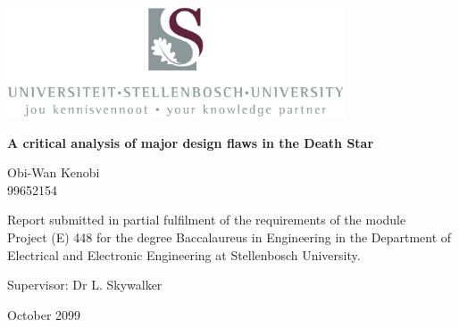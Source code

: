 \graphicspath{{frontmatter/fig/}}

\begin{titlepage}
\begin{center}

\includegraphics[width=10cm]{USlogo-top}

\vfill

{\sffamily \bfseries \huge A critical analysis of major design flaws in the Death Star \par}

\vfill

{\large {\Large Obi-Wan Kenobi} \\ 99652154 \par}

\vfill

\vfill

{Report submitted in partial fulfilment of the requirements of the module \\
Project (E) 448 for the degree Baccalaureus in Engineering in the Department of
Electrical and Electronic Engineering at Stellenbosch University. \par}

\vfill

{\large {Supervisor}: Dr L. Skywalker} %

\vfill

{\Large October 2099}
\end{center}
\end{titlepage}
